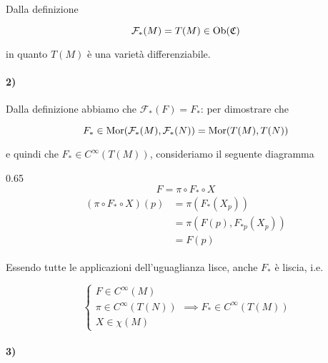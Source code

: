 {Dalla definizione

\begin{equation}
	\mathcal{F}_{*}(M) = T(M) \in \operatorname{Ob}(\mathfrak{C})
\end{equation}

in quanto $ T(M) $ è una varietà differenziabile.

\paragraph{2)}

Dalla definizione abbiamo che $ \mathcal{F}_{*}(F) = F_{*} $: per dimostrare che

\begin{equation}
	F_{*} \in \operatorname{Mor}(\mathcal{F}_{*}(M),\mathcal{F}_{*}(N)) = \operatorname{Mor}(T(M),T(N))
\end{equation}

e quindi che $ F_{*} \in C^{\infty}(T(M)) $, consideriamo il seguente diagramma

	{0.65}{%
			\begin{equation}
				F = \pi \circ F_{*} \circ X
			\end{equation}
			\begin{align}
				\begin{split}
					(\pi \circ F_{*} \circ X)(p) &= \pi (F_{*} (X_{p})) \\
					&= \pi(F(p), F_{*p}(X_{p})) \\
					&= F(p)
				\end{split}
			\end{align}
			}

Essendo tutte le applicazioni dell'uguaglianza lisce, anche $ F_{*} $ è liscia, i.e.

\begin{equation}
	\begin{cases}
		F \in C^{\infty}(M) \\
		\pi \in C^{\infty}(T(N)) \\
		X \in \chi(M)
	\end{cases} %
	\implies %
	F_{*} \in C^{\infty}(T(M))
\end{equation}

\paragraph{3)}

}
